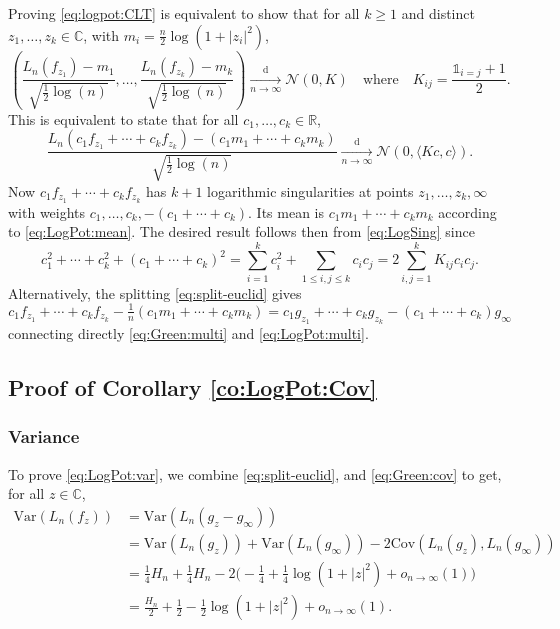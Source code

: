 \documentclass[10pt,reqno]{amsart}
\numberwithin{equation}{section}
\numberwithin{figure}{section}
\theoremstyle{plain}
\newcommand{\<}{\langle}
\renewcommand{\>}{\rangle}
\begin{document}
Proving \eqref{eq:logpot:CLT} is equivalent to show that for all $k\geq1$ and distinct $z_1,\ldots,z_k\in\mathbb{C}$, with $m_i=\frac{n}{2}\log(1+|z_i|^2)$,
\begin{equation}
    \left(\frac{L_n(f_{z_1})-m_1}{\sqrt{\frac{1}{2}\log(n)}},\ldots,\frac{L_n(f_{z_k})-m_k}{\sqrt{\frac{1}{2}\log(n)}}\right)
    \xrightarrow[n\to\infty]{\mathrm{d}}
    \mathcal{N}(0,K)
    \quad\text{where}\quad
    K_{ij}=\frac{\mathbb{1}_{i=j}+1}{2}.
\end{equation}
This is equivalent to state that for all $c_1,\ldots,c_k\in\mathbb{R}$,
\begin{equation}
    \frac{L_n(c_1f_{z_1}+\cdots+c_kf_{z_k})-(c_1m_1+\cdots+c_km_k)}{\sqrt{\frac{1}{2}\log(n)}}
    \xrightarrow[n\to\infty]{\mathrm{d}}
    \mathcal{N}(0,\langle Kc,c\rangle).
\end{equation}
Now $c_1f_{z_1}+\cdots+c_kf_{z_k}$ has $k+1$ logarithmic singularities at points $z_1,\ldots,z_k,\infty$ with weights
$c_1,\ldots,c_k,-(c_1+\cdots+c_k)$. Its mean is $c_1m_1+\cdots+c_km_k$ according to \eqref{eq:LogPot:mean}. The desired result follows then from \eqref{eq:LogSing} since
\begin{equation}
    c_1^2+\cdots+c_k^2+(c_1+\cdots+c_k)^2
    =\sum_{i=1}^kc_i^2+\sum_{1\leq i,j\leq k}c_ic_j
    =2\sum_{i,j=1}^kK_{ij}c_ic_j.
\end{equation}
Alternatively, the splitting \eqref{eq:split-euclid} gives
\begin{equation}
    c_1f_{z_1}+\cdots+c_kf_{z_k}-\tfrac{1}{n}(c_1m_1+\cdots+c_km_k)
    =c_1g_{z_1}+\cdots+c_kg_{z_k}-(c_1+\cdots+c_k)g_\infty
\end{equation}
connecting directly \eqref{eq:Green:multi} and \eqref{eq:LogPot:multi}.

\subsection{Proof of Corollary \ref{co:LogPot:Cov}}
\label{se:proof:co:LogPot:Cov}

\subsubsection{Variance}

To prove \eqref{eq:LogPot:var}, we combine \eqref{eq:split-euclid}, and \eqref{eq:Green:cov} to get, for all $z\in\mathbb{C}$,
\begin{align}
  \mathrm{Var}(L_n(f_z))
  &=\mathrm{Var}(L_n(g_z-g_\infty))\\
  &=\mathrm{Var}(L_n(g_z))+\mathrm{Var}(L_n(g_\infty))-2\mathrm{Cov}(L_n(g_z),L_n(g_\infty))\\
  &=\frac14H_n+\frac14H_n-2\bigl(-\frac14+\frac14\log(1+|z|^2)+o_{n\to\infty}(1)\bigr)\\
  &=\frac{H_n}{2}+\frac{1}{2}-\frac{1}{2}\log(1+|z|^2)+o_{n\to\infty}(1).
\end{align}
\end{document}
